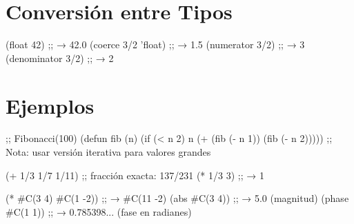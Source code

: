\section{Conversión entre Tipos}

\begin{lispcode}
(float 42)           ;; → 42.0
(coerce 3/2 'float)  ;; → 1.5
(numerator 3/2)      ;; → 3
(denominator 3/2)    ;; → 2
\end{lispcode}

\section{Ejemplos}

\begin{examplebox}[title=Precisión arbitraria]
\begin{lispcode}
;; Fibonacci(100)
(defun fib (n)
  (if (< n 2) n
    (+ (fib (- n 1)) (fib (- n 2)))))
;; Nota: usar versión iterativa para valores grandes
\end{lispcode}
\end{examplebox}

\begin{examplebox}[title=Aritmética exacta con racionales]
\begin{lispcode}
(+ 1/3 1/7 1/11)  ;; fracción exacta: 137/231
(* 1/3 3)         ;; → 1
\end{lispcode}
\end{examplebox}

\begin{examplebox}[title=Números complejos]
\begin{lispcode}
(* #C(3 4) #C(1 -2))  ;; → #C(11 -2)
(abs #C(3 4))         ;; → 5.0 (magnitud)
(phase #C(1 1))       ;; → 0.785398... (fase en radianes)
\end{lispcode}
\end{examplebox}

